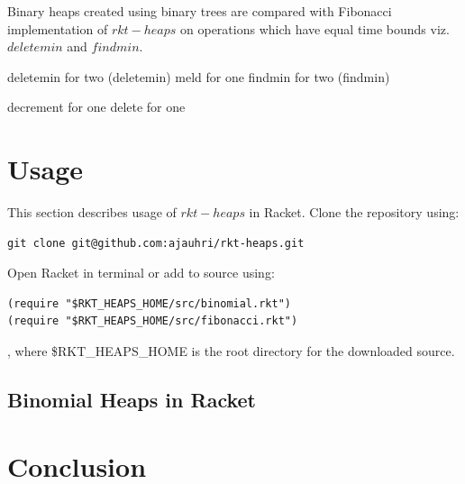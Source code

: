 \documentclass{llncs}
\begin{document}
Binary heaps created using binary trees are compared with Fibonacci implementation of $rkt-heaps$ on operations which have equal time bounds viz. $deletemin$ and $findmin$.

deletemin for two (deletemin)
meld for one 
findmin for two (findmin)

decrement for one
delete for one

\section{Usage}
This section describes usage of $rkt-heaps$ in Racket. Clone the repository using: 
\begin{verbatim}
git clone git@github.com:ajauhri/rkt-heaps.git 
\end{verbatim}

Open Racket in terminal or add to source using:
\begin{verbatim}
(require "$RKT_HEAPS_HOME/src/binomial.rkt")
(require "$RKT_HEAPS_HOME/src/fibonacci.rkt")
\end{verbatim}

, where \$RKT\_HEAPS\_HOME is the root directory for the downloaded source.

\subsection{Binomial Heaps in Racket}


\section{Conclusion}



\end{document}
